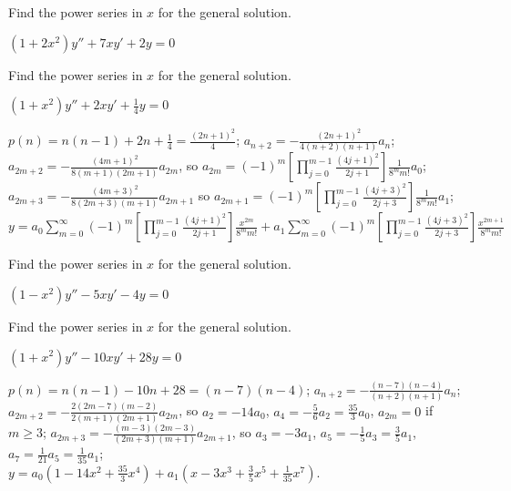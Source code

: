 \documentclass{ximera}
\begin{document}
\begin{problem}\label{exer:7.2.5} 
Find the power series in $x$ for the general solution.

$(1+2x^2)y''+7xy'+2y=0$
\end{problem}

\begin{problem}\label{exer:7.2.6} Find the power series in $x$ for the general solution.

$(1+x^2)y''+2xy'+\frac{1}{4}y=0$

\begin{solution}
    $p(n)=n(n-1)+2n+\frac{1}{4}=\frac{(2n+1)^2}{4}$;
$a_{n+2}=-\frac{(2n+1)^2}{4(n+2)(n+1)}a_n$;
$a_{2m+2}=-\frac{(4m+1)^2}{8(m+1)(2m+1)}a_{2m}$, so
$a_{2m}=
(-1)^m\left[\prod_{j=0}^{m-1}\frac{(4j+1)^2}{2j+1}\right]\frac{1}{8^mm!}a_0$;
$a_{2m+3}=-\frac{(4m+3)^2}{8(2m+3)(m+1)}a_{2m+1}$
 so $a_{2m+1}=
(-1)^m\left[\prod_{j=0}^{m-1}\frac{(4j+3)^2}{2j+3}\right]
\frac{1}{8^mm!}a_1$;
$y=a_0\sum_{m=0}^\infty
(-1)^m\left[\prod_{j=0}^{m-1}\frac{(4j+1)^2}{2j+1}\right]\frac{x^{2m}}{8^mm!}
+a_1\sum_{m=0}^\infty
(-1)^m\left[\prod_{j=0}^{m-1}\frac{(4j+3)^2}{2j+3}\right]
\frac{x^{2m+1}}{8^mm!}$
\end{solution}
\end{problem}

\begin{problem}\label{exer:7.2.7}
Find the power series in $x$ for the general solution.

$(1-x^2)y''-5xy'-4y=0$
\end{problem}

\begin{problem}\label{exer:7.2.8} 
Find the power series in $x$ for the general solution.

$(1+x^2)y''-10xy'+28y=0$

\begin{solution}
    $p(n)=n(n-1)-10n+28=(n-7)(n-4)$;
$a_{n+2}=-\frac{(n-7)(n-4)}{(n+2)
(n+1)}a_n$;
$a_{2m+2}=-\frac{2(2m-7)(m-2)}{2(m+1)(2m+1)}a_{2m}$, so
$a_2=-14a_0$, $a_4=-\frac{5}{6}a_2=\frac{35}{3}a_0$,
$a_{2m}=0$ if $m\geq 3$;
$a_{2m+3}=-\frac{(m-3)(2m-3)}{(2m+3)(m+1)}a_{2m+1}$,
so $a_3=-3a_1$, $a_5=-\frac{1}{5}a_3=\frac{3}{5}a_1$,
$a_7=\frac{1}{21}a_5=\frac{1}{35}a_1$;\\
$y=a_0\left(1-14x^2+\frac{35}{3}x^4\right)+a_1\left(x-3x^3+\frac{3}{5}x^5
+\frac{1}{35}x^7\right)$.
\end{solution}
\end{problem}
\end{document}
